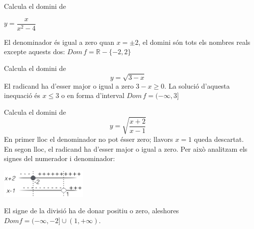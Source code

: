 \begin{resolt}[E]{Calcula el domini de \par
		  $y=\dfrac{x}{x^2-4}$
	}
  El denominador és igual a zero quan $x=\pm 2$, el domini són tots els nombres reals excepte aquests dos: $Dom\, f=\mathbb{R}-\{-2,2\}$
\end{resolt}  
\vspace{-0.75cm}
\begin{resolt}{Calcula el domini de 	\begin{equation*}
	y=\sqrt{3-x}
		\end{equation*}  }
 El radicand ha d'esser major o igual a zero $3-x \geq 0$. La solució d'aquesta inequació és $x\leq 3$ o en forma d'interval $Dom\, f=(-\infty, 3]$
\end{resolt}  
\vspace{-0.75cm}
\begin{resolt}{Calcula el domini de 	\begin{equation*}
	y=\sqrt{\dfrac{x+2}{x-1}}
		\end{equation*}}
	  En primer lloc el denominador no pot ésser zero; llavors $x=1$ queda descartat. En segon lloc, el radicand ha d'esser major o igual a zero. Per això analitzam els signes del numerador i denominador:
	\begin{center}
		\includegraphics[width=0.32\textwidth]{img-05/chap-fe-domsignes.png}
	\end{center}
	
	El signe de la divisió ha de donar positiu o zero, aleshores $Dom f=(-\infty, -2] \cup (1, +\infty)$.
\end{resolt}


